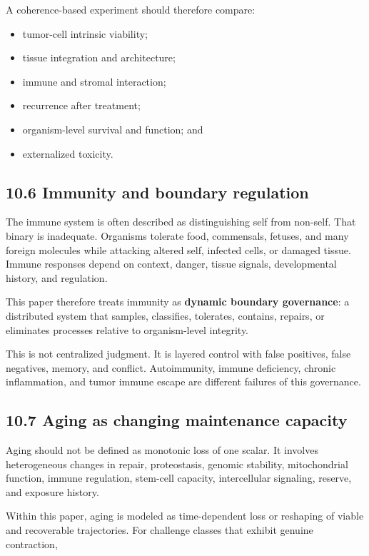 \documentclass[
  11pt,
]{article}
\providecommand{\tightlist}{%
  \setlength{\itemsep}{0pt}\setlength{\parskip}{0pt}}
\begin{document}
A coherence-based experiment should therefore compare:

\begin{itemize}
\tightlist
\item
  tumor-cell intrinsic viability;
\item
  tissue integration and architecture;
\item
  immune and stromal interaction;
\item
  recurrence after treatment;
\item
  organism-level survival and function; and
\item
  externalized toxicity.
\end{itemize}

\subsection{10.6 Immunity and boundary
regulation}\label{immunity-and-boundary-regulation}

The immune system is often described as distinguishing self from
non-self. That binary is inadequate. Organisms tolerate food,
commensals, fetuses, and many foreign molecules while attacking altered
self, infected cells, or damaged tissue. Immune responses depend on
context, danger, tissue signals, developmental history, and regulation.

This paper therefore treats immunity as \textbf{dynamic boundary
governance}: a distributed system that samples, classifies, tolerates,
contains, repairs, or eliminates processes relative to organism-level
integrity.

This is not centralized judgment. It is layered control with false
positives, false negatives, memory, and conflict. Autoimmunity, immune
deficiency, chronic inflammation, and tumor immune escape are different
failures of this governance.

\subsection{10.7 Aging as changing maintenance
capacity}\label{aging-as-changing-maintenance-capacity}

Aging should not be defined as monotonic loss of one scalar. It involves
heterogeneous changes in repair, proteostasis, genomic stability,
mitochondrial function, immune regulation, stem-cell capacity,
intercellular signaling, reserve, and exposure history.

Within this paper, aging is modeled as time-dependent loss or reshaping
of viable and recoverable trajectories. For challenge classes that
exhibit genuine contraction,
\end{document}
